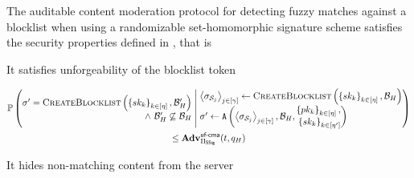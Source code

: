 \iffalse
\begin{theorem}
	
	The auditable content moderation protocol for detecting fuzzy matches against a blocklist 
	when using a randomizable set-homomorphic signature scheme \sigScheme satisfies the security 
	properties defined in , that is 
	\enumListStart
	
	\item It satisfies unforgeability of the blocklist token 
	
	\begin{footnotesize}
		\begin{gather*}
		 \cprob{\bigg}{\begin{array}{@{}r@{}}
					\genericSigAlt =  \createBlocklist\left(\setOfAuditorPrivkeys, \blocklistEmbedded' \right) \\
					\land ~\blocklistEmbedded' \not \subseteq \blocklistEmbedded
			\end{array}}{\begin{array}[m]{@{}l@{}}
					\tupleDefn{\genericSig[\projBuckets[\projIdx]]}{\projIdx \in \nats[\numProjections]}
					\assign 
					\createBlocklist\left(\setOfAuditorPrivkeys, 
					\blocklistEmbedded\right) \\
					\genericSigAlt \assign 
					\adversary\left(\tupleDefn{\genericSig[\projBuckets[\projIdx]]}{\projIdx \in 
					\nats[\numProjections]}, \blocklistEmbedded, 
					\begin{array}{@{}r@{}} \setOfAuditorPubkeys, \\ \setOfDishonestAuditorPrivkeys
					\end{array}\right)
			\end{array}} \\ \le \ufcmaAdv
		\end{gather*}
	\end{footnotesize}
	
	\item It hides non-matching content from the server 



\end{theorem}
